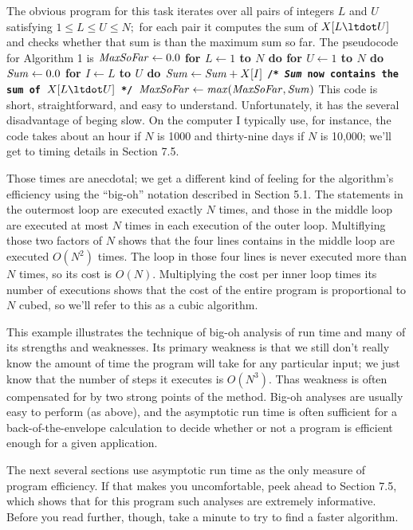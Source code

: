 The obvious program for this task iterates over all pairs of integers $L$ and $U$
satisfying $1\le L\le U\le N;$ for each pair it computes the sum of
$X[L\ltdot U]$ and checks whether that sum is than the maximum sum so far. The
pseudocode for Algorithm 1 is
\begindisplay
\vbox{
\+${\it MaxSoFar}\leftarrow 0.0$\cr
\+\bf for $L\leftarrow1$ to $N$ do\cr
\+\quad\bf for $U\leftarrow1$ to $N$ do\cr
\+\qquad${\it Sum}\leftarrow 0.0$\cr
\+\qquad\bf for $I\leftarrow L$ to $U$ do\cr
\+\qquad\quad${\it Sum}\leftarrow {\it Sum}+X[I]$\cr
\+\qquad\tt /* {\it Sum} now contains the sum of $X[L\ltdot U]$ */\cr
\+\qquad${\it MaxSoFar}\leftarrow {\it max}({\it MaxSoFar}, {\it Sum})$\cr}
\enddisplay
This code is short, straightforward, and easy to understand. Unfortunately, it
has the several disadvantage of beging slow. On the computer I typically use, for
instance, the code takes about an hour if $N$ is 1000 and thirty-nine days if $N$
is 10{,}000; we'll get to timing details in Section 7.5.

Those times are anecdotal; we get a different kind of feeling for the algorithm's
efficiency using the ``big-oh'' notation described in Section 5.1. The statements
in the outermost loop are executed exactly $N$ times, and those in the middle
loop are executed at most $N$ times in each execution of the outer loop.
Multiflying those two factors of $N$ shows that the four lines contains in the
middle loop are executed $O(N^2)$ times. The loop in those four lines is never
executed more than $N$ times, so its cost is $O(N).$ Multiplying the cost per
inner loop times its number of executions shows that the cost of the entire
program is proportional to $N$ cubed, so we'll refer to this as a cubic
algorithm.

This example illustrates the technique of big-oh analysis of run time and many
of its strengths and weaknesses. Its primary weakness is that we still don't
really know the amount of time the program will take for any particular input;
we just know that the number of steps it executes is $O(N^3).$ Thas weakness is
often compensated for by two strong points of the method. Big-oh analyses are
usually easy to perform (as above), and the asymptotic run time is often
sufficient for a back-of-the-envelope calculation to decide whether or not a
program is efficient enough for a given application.

The next several sections use asymptotic run time as the only measure of program
efficiency. If that makes you uncomfortable, peek ahead to Section 7.5, which
shows that for this program such analyses are extremely informative. Before you
read further, though, take a minute to try to find a faster algorithm.

